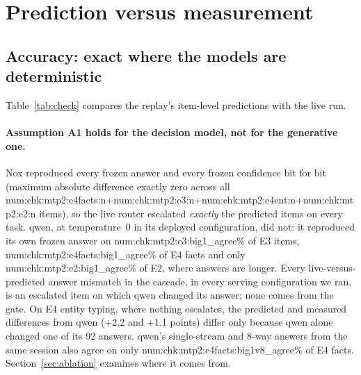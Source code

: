 \documentclass[11pt]{article}
\newcommand{\N}[1]{\csname num:#1\endcsname}
\begin{document}
\section{Prediction versus measurement}
\label{sec:check}

\subsection{Accuracy: exact where the models are deterministic}
Table~\ref{tab:check} compares the replay's item-level predictions with the live run.

\begin{table}[t]
\centering
\small
\setlength{\tabcolsep}{4pt}
\resizebox{\textwidth}{!}{}
\caption{Replay prediction against the live cascade ($c=1$, qwen deployed configuration).
\emph{Escalation}: predicted share escalated, and the share of items where the live router made
the predicted escalation decision. \emph{Answers}: share of items where the live cascade's answer
equals the predicted one, and share where live qwen alone reproduces its own frozen answer.
\emph{$\Delta$ acc.}: cascade minus qwen, predicted (frozen answers) and measured (live run, same
session). \emph{Latency}: measured mean; the naive replay using the frozen request times (qwen's were
8-way concurrent); the replay with single-stream service times measured live; and its relative error.}
\label{tab:check}
\end{table}

\paragraph{Assumption A1 holds for the decision model, not for the generative one.} Nox
reproduced every frozen answer and every frozen confidence bit for bit (maximum absolute difference exactly zero across all \N{chk:mtp2:e4facts:n}+\N{chk:mtp2:e3:n}+\N{chk:mtp2:e4ent:n}+\N{chk:mtp2:e2:n}
items), so the live router escalated \emph{exactly} the predicted items on every task. qwen, at
temperature~0 in its deployed configuration, did not: it reproduced its own frozen answer on
\N{chk:mtp2:e3:big1_agree}\% of E3 items, \N{chk:mtp2:e4facts:big1_agree}\% of E4 facts and only
\N{chk:mtp2:e2:big1_agree}\% of E2, where answers are longer. Every live-versus-predicted answer
mismatch in the cascade, in every serving configuration we ran, is an escalated item on which qwen
changed its answer; none comes from the gate. On E4 entity typing, where nothing escalates, the
predicted and measured differences from qwen (+2.2 and +1.1 points) differ only because qwen alone
changed one of its 92 answers. qwen's single-stream and 8-way answers
from the same session also agree on only \N{chk:mtp2:e4facts:big1v8_agree}\% of E4 facts. Section~\ref{sec:ablation}
examines where it comes from.
\end{document}
